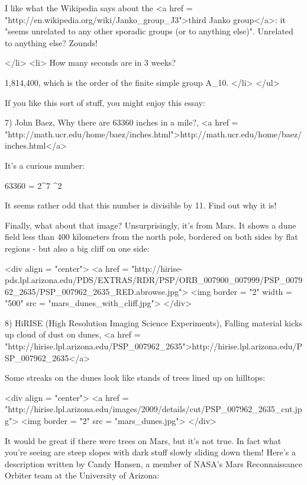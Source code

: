 I like
what the Wikipedia says about the <a href = "http://en.wikipedia.org/wiki/Janko_group_J3">third Janko group</a>: it "seems unrelated
to any other sporadic groups (or to anything else)".  Unrelated
to anything else?  Zounds!

</li>
<li>
How many seconds are in 3 weeks?  

1,814,400, which is the order of the finite simple group A_{10}.
</li>
</ul>

If you like this sort of stuff, you might enjoy this essay:

7) John Baez, Why there are 63360 inches in a mile?, <a href =
"http://math.ucr.edu/home/baez/inches.html">http://math.ucr.edu/home/baez/inches.html</a>

It's a curious number:

63360 = 2^{7} ^{2}  

It seems rather odd that this number is divisible by 11.
Find out why it is!  

Finally, what about that image?  Unsurprisingly, it's from Mars.  It
shows a dune field less than 400 kilometers from the north pole,
bordered on both sides by flat regions - but also a big cliff on one
side:

<div align = "center">
<a href = "http://hirise-pds.lpl.arizona.edu/PDS/EXTRAS/RDR/PSP/ORB_007900_007999/PSP_007962_2635/PSP_007962_2635_RED.abrowse.jpg">
<img border = "2" width = "500" src = "mars_dunes_with_cliff.jpg">
</div>

8) HiRISE (High Resolution Imaging Science Experiments), 
Falling material kicks up cloud of dust on dunes,
<a href = "http://hirise.lpl.arizona.edu/PSP_007962_2635">http://hirise.lpl.arizona.edu/PSP_007962_2635</a>

Some streaks on the dunes look like stands of trees lined up on hilltops: 

<div align = "center">
<a href = "http://hirise.lpl.arizona.edu/images/2009/details/cut/PSP_007962_2635_cut.jpg">
<img border = "2" src = "mars_dunes.jpg">
</div>

It would be great if there were trees on Mars, but it's not true.  In
fact what you're seeing are steep slopes with dark stuff slowly
sliding down them!  Here's a description written by Candy Hansen, a
member of NASA's Mars Reconnaissance Orbiter team at the University of
Arizona:


